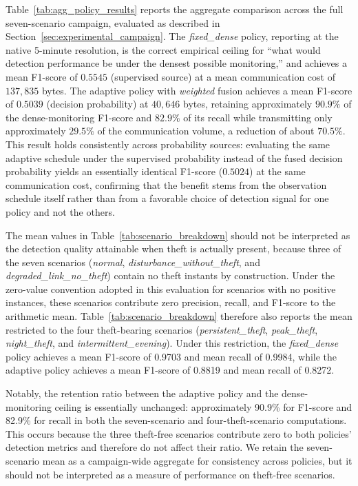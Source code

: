 \documentclass{ieeeaccess}
\begin{document}
Table~\ref{tab:agg_policy_results} reports the aggregate comparison across the full seven-scenario campaign, evaluated as described in Section~\ref{sec:experimental_campaign}. The \textit{fixed\_dense} policy, reporting at the native 5-minute resolution, is the correct empirical ceiling for ``what would detection performance be under the densest possible monitoring,'' and achieves a mean F1-score of $0.5545$ (supervised source) at a mean communication cost of $137{,}835$ bytes. The adaptive policy with \textit{weighted} fusion achieves a mean F1-score of $0.5039$ (decision probability) at $40{,}646$ bytes, retaining approximately $90.9\%$ of the dense-monitoring F1-score and $82.9\%$ of its recall while transmitting only approximately $29.5\%$ of the communication volume, a reduction of about $70.5\%$. This result holds consistently across probability sources: evaluating the same adaptive schedule under the supervised probability instead of the fused decision probability yields an essentially identical F1-score ($0.5024$) at the same communication cost, confirming that the benefit stems from the observation schedule itself rather than from a favorable choice of detection signal for one policy and not the others.

The mean values in Table~\ref{tab:scenario_breakdown} should not be interpreted as the detection quality attainable when theft is actually present, because three of the seven scenarios (\textit{normal}, \textit{disturbance\_without\_theft}, and \textit{degraded\_link\_no\_theft}) contain no theft instants by construction. Under the zero-value convention adopted in this evaluation for scenarios with no positive instances, these scenarios contribute zero precision, recall, and F1-score to the arithmetic mean. Table~\ref{tab:scenario_breakdown} therefore also reports the mean restricted to the four theft-bearing scenarios (\textit{persistent\_theft}, \textit{peak\_theft}, \textit{night\_theft}, and \textit{intermittent\_evening}). Under this restriction, the \textit{fixed\_dense} policy achieves a mean F1-score of 0.9703 and mean recall of 0.9984, while the adaptive policy achieves a mean F1-score of 0.8819 and mean recall of 0.8272.

Notably, the retention ratio between the adaptive policy and the dense-monitoring ceiling is essentially unchanged: approximately 90.9\% for F1-score and 82.9\% for recall in both the seven-scenario and four-theft-scenario computations. This occurs because the three theft-free scenarios contribute zero to both policies' detection metrics and therefore do not affect their ratio. We retain the seven-scenario mean as a campaign-wide aggregate for consistency across policies, but it should not be interpreted as a measure of performance on theft-free scenarios.
\end{document}
